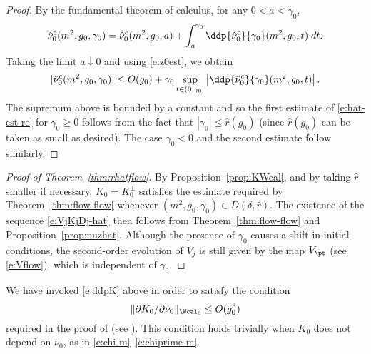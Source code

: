 \begin{proof}
By the fundamental theorem of calculus, for any $0 < a < \gamma_0$,
\begin{equation}
\hat\nu_0^c(m^2, g_0, \gamma_0)
  =
\hat\nu_0^c(m^2, g_0, a)
  +
\int_a^{\gamma_0} \ddp{\hat\nu_0^c}{\gamma_0} (m^2, g_0, t) \; dt.
\end{equation}
Taking the limit $a\downarrow 0$ and using \eqref{e:z0est}, we obtain
\begin{equation}
|\hat\nu_0^c(m^2, g_0, \gamma_0)|
  \leq
O(g_0)
  +
\gamma_0
\sup_{t \in (0, \gamma_0]}
\left|\ddp{\hat\nu_0^c}{\gamma_0}(m^2, g_0, t)\right|.
\end{equation}
The supremum above is bounded by a constant and so
the first estimate of \eqref{e:hat-est-re} for $\gamma_0 \geq 0$
follows from the fact that $|\gamma_0| \leq \hat r(g_0)$
(since $\hat r(g_0)$ can be taken as small as desired).
The case $\gamma_0 < 0$ and the second estimate follow similarly.
\end{proof}

\begin{proof}[Proof of Theorem~\ref{thm:rhatflow}]
By Proposition~\ref{prop:KWcal},
and by taking $\hat r$ smaller if necessary,
$K_0 = K^\pm_0$ satisfies the estimate required by Theorem~\ref{thm:flow-flow}
whenever $(m^2, g_0, \gamma_0) \in D(\delta, \hat r)$. The
existence of the sequence \eqref{e:VjKjDj-hat} then follows from
Theorem~\ref{thm:flow-flow} and Proposition~\ref{prop:nuzhat}.
Although the presence of $\gamma_0$ causes a shift in initial
conditions, the second-order evolution of $V_j$ is still given by the map
$V_\pt$ (see \eqref{e:Vflow}),
which is independent of $\gamma_0$.
\end{proof}

\begin{rk}
We have invoked \eqref{e:ddpK} above in order to satisfy the condition
\begin{equation}
\|\partial K_0/\partial\nu_0\|_{\Wcal_0} \le O(g_0^3)
\end{equation}
required in the proof of \cite[Lemma~\ref{log-lem:gzmuprime}]{BBS-saw4-log}
(see \cite[\eqref{log-e:induct1}]{BBS-saw4-log}). This condition holds trivially
when $K_0$ does not depend on $\nu_0$, as in \eqref{e:chi-m}--\eqref{e:chiprime-m}.
\end{rk}